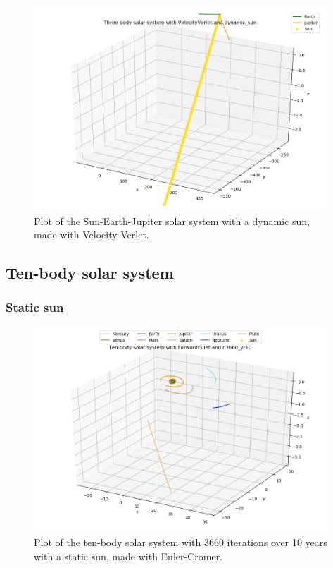 \documentclass{article}
\begin{document}
    \begin{figure}[H]
        \centering
        \includegraphics[width = 11cm]{img/plot3D_S_E_J_V_dynamic_sun.png}
        \caption{Plot of the Sun-Earth-Jupiter solar system with a dynamic sun, made with Velocity Verlet.}
        \label{fig:plot3D_S_E_J_V_dynamic_sun}
    \end{figure}


\subsection{Ten-body solar system}

\subsubsection{Static sun}

    \begin{figure}[H]
        \centering
        \includegraphics[width = 11cm]{img/plot3D_10body_F_n3660_yr10.png}
        \caption{Plot of the ten-body solar system with 3660 iterations over 10 years with a static sun, made with Euler-Cromer.}
        \label{fig:plot3D_10body_F_n3660_yr10}
    \end{figure}
\end{document}
